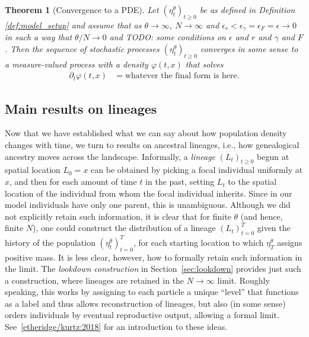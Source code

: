 \documentclass[12pt]{article}
\newtheorem{theorem}{Theorem}[section]
\newcommand{\comment}[1]{{\color{blue} \it #1}}
\begin{document}
\begin{theorem}[Convergence to a PDE]
    \label{thm:local_convergence}
    Let $(\eta^\theta_t)_{t \geq 0}$
    be as defined in Definition \ref{def:model_setup}
    and assume that as $\theta \to \infty$, $N \to \infty$
    and $\epsilon_r < \epsilon_\gamma = \epsilon_F = \epsilon \to 0$
    in such a way that $\theta/N \to 0$
    and
    \comment{TODO: some conditions on $\epsilon$ and $r$ and $\gamma$ and $F$}.
    Then the sequence of stochastic processes $(\eta^\theta_t)_{t \ge 0}$
    converges \comment{in some sense}
    to a measure-valued process with a density $\varphi(t, x)$
    that solves
    \begin{align}
        \partial_t \varphi(t, x)
        &=
        \text{whatever the final form is here} .
    \end{align}
\end{theorem}


\subsection{Main results on lineages}

Now that we have established what we can say about how population density changes with time,
we turn to results on ancestral lineages,
i.e., how genealogical ancestry moves across the landscape.
Informally,
a \emph{lineage} $(L_t)_{t \ge 0}$
begun at spatial location $L_0 = x$
can be obtained by picking a focal individual uniformly at $x$,
and then for each amount of time $t$ in the past,
setting $L_t$ to the spatial location of the individual from whom
the focal individual inherits.
Since in our model individuals have only one parent, this is unambiguous.
Although we did not explicitly retain such information,
it is clear that
for finite $\theta$ (and hence, finite $N$),
one could construct the distribution of a lineage $(L_t)_{t=0}^T$
given the history of the population $(\eta^\theta_t)_{t = 0}^T$,
for each starting location to which $\eta^\theta_T$ assigns positive mass.
It is less clear, however, how to formally retain such information in the limit.
The \emph{lookdown construction} in Section~\ref{sec:lookdown}
provides just such a construction,
where lineages are retained in the $N \to \infty$ limit.
Roughly speaking,
this works by assigning to each particle a unique ``level''
that functions as a label and thus allows reconstruction of lineages,
but also (in some sense) orders individuals by eventual reproductive output,
allowing a formal limit.
See~\ref{etheridge/kurtz:2018} for an introduction to these ideas.
\end{document}
